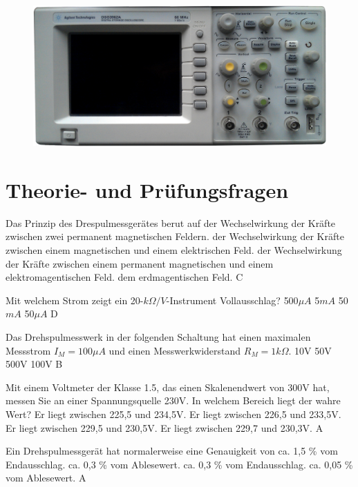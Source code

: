 \begin{figure}
 \vspace{-6cm}
 \includegraphics[scale=0.08]{Messtechnik/Bilder/oszi_foto.png}
 \vspace{-6cm}
\end{figure}

\section*{Theorie- und Prüfungsfragen} 

{Das Prinzip des Drespulmessgerätes berut auf}%
{der Wechselwirkung der Kräfte zwischen zwei permanent magnetischen Feldern.}%
{der Wechselwirkung der Kräfte zwischen einem magnetischen und einem elektrischen Feld.}%
{der Wechselwirkung der Kräfte zwischen einem permanent magnetischen und einem elektromagentischen Feld.}%
{dem erdmagentischen Feld.}%
{C}%

{Mit welchem Strom zeigt ein 20-$k\Omega/V$-Instrument Vollausschlag?}%
{500$\mu A$}%
{5$mA$}%
{50$mA$}%
{50$\mu A$}%
{D}%

{Das Drehspulmesswerk in der folgenden Schaltung hat einen maximalen Messstrom $I_M = 100\mu A$ und einen Messwerkwiderstand $R_M = 1 k\Omega$.}%
{10V}%
{50V}%
{500V}%
{100V}%
{B}%


{Mit einem Voltmeter der Klasse 1.5, das einen Skalenendwert von 300V hat, messen Sie an einer Spannungsquelle 230V. In welchem Bereich liegt der wahre Wert?}%
{Er liegt zwischen 225,5 und 234,5V.}%
{Er liegt zwischen 226,5 und 233,5V.}%
{Er liegt zwischen 229,5 und 230,5V.}%
{Er liegt zwischen 229,7 und 230,3V.}%
{A}%


{Ein Drehspulmessgerät hat normalerweise eine Genauigkeit von}%
{ca. 1,5 \% vom Endausschlag.}%
{ca. 0,3 \% vom Ablesewert.}%
{ca. 0,3 \% vom Endausschlag.}%
{ca. 0,05 \% vom Ablesewert.}%
{A}%

